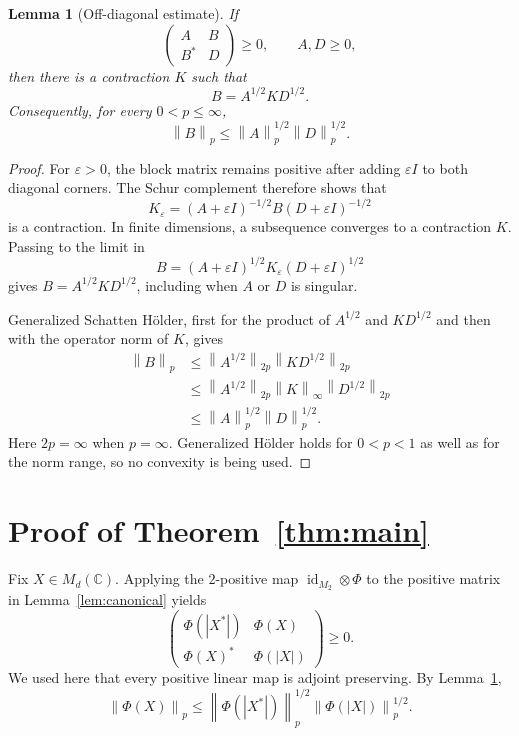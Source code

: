 \documentclass[11pt]{article}
\newtheorem{lemma}[theorem]{Lemma}
\newcommand{\Md}{M_d(\mathbb C)}
\newcommand{\norm}[1]{\left\lVert #1\right\rVert}
\begin{document}
\begin{lemma}[Off-diagonal estimate]\label{lem:block}
If
\[
                  \begin{pmatrix}A&B\\B^*&D\end{pmatrix}\ge0,
                  \qquad A,D\ge0,
\]
then there is a contraction $K$ such that
\[
                         B=A^{1/2}KD^{1/2}.
\]
Consequently, for every $0<p\leq\infty$,
\begin{equation}\label{eq:blockholder}
                 \norm{B}_p
                 \leq \norm{A}_p^{1/2}\norm{D}_p^{1/2}.
\end{equation}
\end{lemma}

\begin{proof}
For $\varepsilon>0$, the block matrix remains positive after adding
$\varepsilon I$ to both diagonal corners.  The Schur complement therefore
shows that
\[
 K_\varepsilon=(A+\varepsilon I)^{-1/2}
                 B(D+\varepsilon I)^{-1/2}
\]
is a contraction.  In finite dimensions, a subsequence converges to a
contraction $K$.  Passing to the limit in
\[
 B=(A+\varepsilon I)^{1/2}K_\varepsilon
   (D+\varepsilon I)^{1/2}
\]
gives $B=A^{1/2}KD^{1/2}$, including when $A$ or $D$ is singular.

Generalized Schatten H\"older, first for the product of
$A^{1/2}$ and $KD^{1/2}$ and then with the operator norm of $K$, gives
\begin{align*}
 \norm{B}_p
 &\leq \norm{A^{1/2}}_{2p}
          \norm{KD^{1/2}}_{2p}\\
 &\leq \norm{A^{1/2}}_{2p}\norm{K}_\infty
          \norm{D^{1/2}}_{2p}\\
 &\leq \norm{A}_p^{1/2}\norm{D}_p^{1/2}.
\end{align*}
Here $2p=\infty$ when $p=\infty$.  Generalized H\"older holds for
$0<p<1$ as well as for the norm range, so no convexity is being used.
\end{proof}

\section{Proof of Theorem~\ref{thm:main}}

Fix $X\in\Md$.  Applying the $2$-positive map
$\operatorname{id}_{M_2}\otimes\Phi$ to the positive matrix in
Lemma~\ref{lem:canonical} yields
\[
 \begin{pmatrix}
  \Phi(|X^*|)&\Phi(X)\\
  \Phi(X)^*&\Phi(|X|)
 \end{pmatrix}\ge0.
\]
We used here that every positive linear map is adjoint preserving.  By
Lemma~\ref{lem:block},
\begin{equation}\label{eq:mainestimate}
 \norm{\Phi(X)}_p
 \leq
 \norm{\Phi(|X^*|)}_p^{1/2}
 \norm{\Phi(|X|)}_p^{1/2}.
\end{equation}
\end{document}
